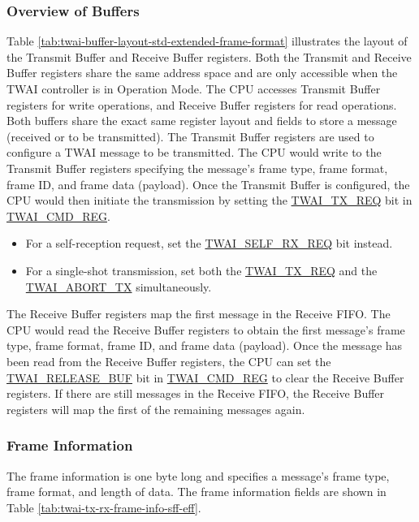 \documentclass[main\_\_EN.tex]{subfiles}
\begin{document}
\subsubsection{Overview of Buffers}



Table \ref{tab:twai-buffer-layout-std-extended-frame-format} illustrates the layout of the Transmit Buffer and Receive Buffer registers. Both the Transmit and Receive Buffer registers share the same address space and are only accessible when the TWAI controller is in Operation Mode. The CPU accesses Transmit Buffer registers for write operations, and Receive Buffer registers for read operations. Both buffers share the exact same register layout and fields to store a message (received or to be transmitted).
The Transmit Buffer registers are used to configure a TWAI message to be transmitted. The CPU would write to the Transmit Buffer registers specifying the message’s frame type, frame format, frame ID, and frame data (payload). Once the Transmit Buffer is configured, the CPU would then initiate the transmission by setting the  \hyperref[fielddesc:TWAITXREQ]{TWAI\_TX\_REQ} bit in \hyperref[regdesc:TWAICMDREG]{TWAI\_CMD\_REG}.

\begin{itemize}
    \item For a self-reception request, set the \hyperref[fielddesc:TWAISELFRXREQ]{TWAI\_SELF\_RX\_REQ} bit instead.
    \item For a single-shot transmission, set both the \hyperref[fielddesc:TWAITXREQ]{TWAI\_TX\_REQ} and the \hyperref[fielddesc:TWAIABORTTX]{TWAI\_ABORT\_TX} simultaneously.
\end{itemize}

The Receive Buffer registers map the first message in the Receive FIFO. The CPU would read the Receive Buffer registers to obtain the first message’s frame type, frame format, frame ID, and frame data (payload). Once the message has been read from the Receive Buffer registers, the CPU can set the \hyperref[fielddesc:TWAIRELEASEBUF]{TWAI\_RELEASE\_BUF} bit in \hyperref[regdesc:TWAICMDREG]{TWAI\_CMD\_REG} to clear the Receive Buffer registers. If there are still messages in the Receive FIFO, the Receive Buffer registers will map the first of the remaining messages again.

\subsubsection{Frame Information}
The frame information is one byte long and specifies a message’s frame type, frame format, and length of data. The frame information fields are shown in Table \ref{tab:twai-tx-rx-frame-info-sff-eff}.
\end{document}
